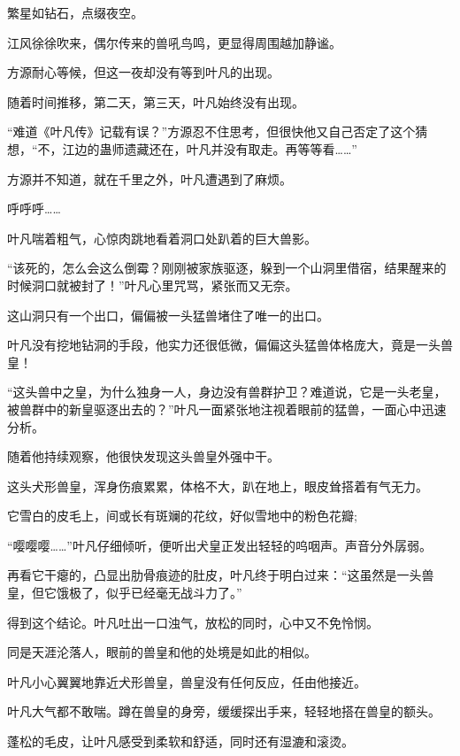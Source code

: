 
\begin{this_body}

繁星如钻石，点缀夜空。

江风徐徐吹来，偶尔传来的兽吼鸟鸣，更显得周围越加静谧。

方源耐心等候，但这一夜却没有等到叶凡的出现。

随着时间推移，第二天，第三天，叶凡始终没有出现。

“难道《叶凡传》记载有误？”方源忍不住思考，但很快他又自己否定了这个猜想，“不，江边的蛊师遗藏还在，叶凡并没有取走。再等等看……”

方源并不知道，就在千里之外，叶凡遭遇到了麻烦。

呼呼呼……

叶凡喘着粗气，心惊肉跳地看着洞口处趴着的巨大兽影。

“该死的，怎么会这么倒霉？刚刚被家族驱逐，躲到一个山洞里借宿，结果醒来的时候洞口就被封了！”叶凡心里咒骂，紧张而又无奈。

这山洞只有一个出口，偏偏被一头猛兽堵住了唯一的出口。

叶凡没有挖地钻洞的手段，他实力还很低微，偏偏这头猛兽体格庞大，竟是一头兽皇！

“这头兽中之皇，为什么独身一人，身边没有兽群护卫？难道说，它是一头老皇，被兽群中的新皇驱逐出去的？”叶凡一面紧张地注视着眼前的猛兽，一面心中迅速分析。

随着他持续观察，他很快发现这头兽皇外强中干。

这头犬形兽皇，浑身伤痕累累，体格不大，趴在地上，眼皮耸搭着有气无力。

它雪白的皮毛上，间或长有斑斓的花纹，好似雪地中的粉色花瓣;

“嘤嘤嘤……”叶凡仔细倾听，便听出犬皇正发出轻轻的呜咽声。声音分外孱弱。

再看它干瘪的，凸显出肋骨痕迹的肚皮，叶凡终于明白过来：“这虽然是一头兽皇，但它饿极了，似乎已经毫无战斗力了。”

得到这个结论。叶凡吐出一口浊气，放松的同时，心中又不免怜悯。

同是天涯沦落人，眼前的兽皇和他的处境是如此的相似。

叶凡小心翼翼地靠近犬形兽皇，兽皇没有任何反应，任由他接近。

叶凡大气都不敢喘。蹲在兽皇的身旁，缓缓探出手来，轻轻地搭在兽皇的额头。

蓬松的毛皮，让叶凡感受到柔软和舒适，同时还有湿漉和滚烫。


\end{this_body}
